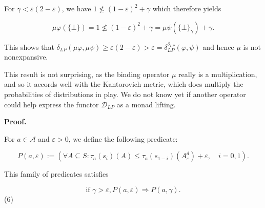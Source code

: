 \documentclass[10pt,a4paper]{article}
\begin{document}
 
  
 
 
For $\gamma<\varepsilon(2-\varepsilon)$, we have $1\not\leq(1-\varepsilon)^{2}+\gamma$ which therefore yields\par
  
\par  \quad  \[\mu\varphi(\{\bot\})=1\not\leq(1-\varepsilon)^{2}+\gamma=\mu\psi(\{\bot\}_{\gamma})+\gamma.\]\quad  \quad  
  
This shows that $\delta_{LP}(\mu\varphi,\mu\psi)\geq\varepsilon(2-\varepsilon)>\varepsilon=\delta_{LP}^{\delta_{LP}}(\varphi,\psi)$ and hence $\mu$ is not nonexpansive.\par
 
 
 
 
This result is not surprising, as the binding operator $\mu$ really is a multiplication, and so it accords well with the Kantorovich metric, which does multiply the probabilities of distributions in play. We do not know yet if another operator could help express the functor $\mathcal{D}_{LP}$ as a monad lifting.\par
 
 
 



 
\par\medskip\noindent\textbf{Proof.}\par
 
 
For $a\in\mathcal{A}$ and $\varepsilon>0$, we define the following predicate:\par
  
\par  \quad  \[P(a,\varepsilon):=(\forall A\subseteq S:\tau_{a}(s_{i})(A)\leq\tau_{a}(s_{1-i})(A^{d}_{\varepsilon})+\varepsilon,\quad i=0,1).\]\quad  \quad  
  
This family of predicates satisfies\par
  
\par  \quad  \[\mbox{if }\gamma>\varepsilon,P(a,\varepsilon)\Rightarrow P(a,\gamma).\]\quad  \quad  (6)\quad  
  
\end{document}
